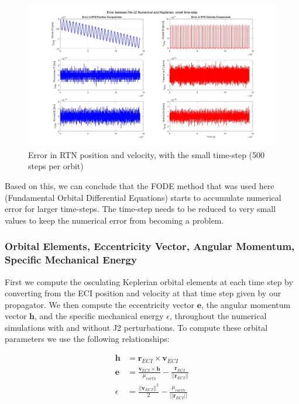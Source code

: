 \begin{figure}[H]
    \centering
    \includegraphics[width=0.75\linewidth]{PS1/Figures/comparing_rtn_small_timestep.jpg}
    \caption{Error in RTN position and velocity, with the small time-step (500 steps per orbit)}
    \label{fig:rtn_compare_small_timestep}
\end{figure}

Based on this, we can conclude that the FODE method that was used here (Fundamental Orbital Differential Equations) starts to accumulate numerical error for larger time-steps. The time-step needs to be reduced to very small values to keep the numerical error from becoming a problem.

\subsubsection{Orbital Elements, Eccentricity Vector, Angular Momentum, Specific Mechanical Energy} \label{sec:oe_compares}

First we compute the osculating Keplerian orbital elements at each time step by converting from the ECI position and velocity at that time step given by our propagator. We then compute the eccentricity vector $\boldsymbol{e}$, the angular momentum vector $\boldsymbol{h}$, and the specific mechanical energy $\epsilon$, throughout the numerical simulations with and without J2 perturbations. To compute these orbital parameters we use the following relationships:

\begin{align}
    \boldsymbol{h} &= \boldsymbol{r}_{ECI} \times \boldsymbol{v}_{ECI} \\
    \boldsymbol{e} &= \frac{\boldsymbol{v}_{ECI} \times \boldsymbol{h}}{\mu_{earth}} - \frac{\boldsymbol{r}_{ECI}}{||\boldsymbol{r}_{ECI}||} \\
    \epsilon &= \frac{||\boldsymbol{v}_{ECI}||^2}{2} - \frac{\mu_{earth}}{||\boldsymbol{r}_{ECI}||}
\end{align}

